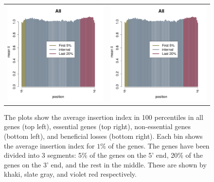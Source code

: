 \documentclass[12pt,letterpaper]{article}
\begin{document}
\begin{figure}
\begin{tabular}{c c}
\includegraphics[scale=0.4, page=3]{insertion-position-bias.pdf}&
\includegraphics[scale=0.4, page=4]{insertion-position-bias.pdf}
\end{tabular}
\caption{The plots show the average insertion index in 100 percentiles in all genes (top left), essential genes (top right), non-essential genes (bottom left), and beneficial losses (bottom right). Each bin shows the average insertion index for $1\%$ of the genes. The genes have been divided into 3 segments: 5\% of
the genes on the 5' end, 20\% of the genes on the 3' end, and the rest in the middle. These are shown by khaki, slate gray, and violet red respectively.}
\label{fig:insertion-position-bias}
\end{figure}
\end{document}

